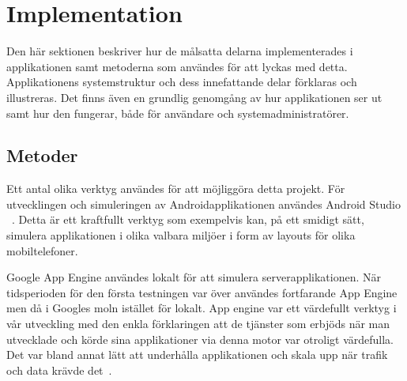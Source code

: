 \documentclass[a4paper, 11pt]{article}
\begin{document}
\newpage
\section{Implementation}
Den här sektionen beskriver hur de målsatta delarna implementerades i applikationen samt metoderna som användes för att lyckas med detta. Applikationens systemstruktur och dess innefattande delar förklaras och illustreras. Det finns även en grundlig genomgång av hur applikationen ser ut samt hur den fungerar, både för användare och systemadministratörer.

\subsection{Metoder}
Ett antal olika verktyg användes för att möjliggöra detta projekt. För utvecklingen och simuleringen av Androidapplikationen användes Android Studio ~\cite{androidstudio}. Detta är ett kraftfullt verktyg som exempelvis kan, på ett smidigt sätt, simulera applikationen i olika valbara miljöer i form av layouts för olika mobiltelefoner.

Google App Engine användes lokalt för att simulera serverapplikationen. När tidsperioden för den första testningen var över användes fortfarande App Engine men då i Googles moln istället för lokalt. App engine var ett värdefullt verktyg i vår utveckling med den enkla förklaringen att de tjänster som erbjöds när man utvecklade och körde sina applikationer via denna motor var otroligt värdefulla. Det var bland annat lätt att underhålla applikationen och skala upp när trafik och data krävde det~\cite{googleappengine}. 

%
\end{document}
